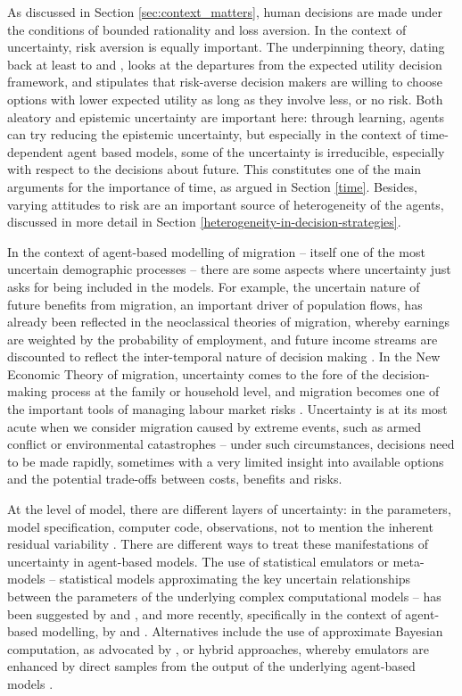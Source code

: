 \documentclass{article}
\begin{document}
As discussed in Section \ref{sec:context_matters}, human decisions are made under the conditions of bounded rationality and loss aversion. In the context of uncertainty, risk aversion is equally important. The underpinning theory, dating back at least to \citet{Pratt1964} and \citet{Arrow1965}, looks at the departures from the expected utility decision framework, and stipulates that risk-averse decision makers are willing to choose options with lower expected utility as long as they involve less, or no risk. Both aleatory and epistemic uncertainty are important here: through learning, agents can try reducing the epistemic uncertainty, but especially in the context of time-dependent agent based models, some of the uncertainty is irreducible, especially with respect to the decisions about future. This constitutes one of the main arguments for the importance of time, as argued in Section \ref{time}. Besides, varying attitudes to risk are an important source of heterogeneity of the agents, discussed in more detail in Section \ref{heterogeneity-in-decision-strategies}.

In the context of agent-based modelling of migration -- itself one of the most uncertain demographic processes -- there are some aspects where uncertainty just asks for being included in the models. For example, the uncertain nature of future benefits from migration, an important driver of population flows, has already been reflected in the neoclassical theories of migration, whereby earnings are weighted by the probability of employment, and future income streams are discounted to reflect the inter-temporal nature of decision making \citep{Massey1993}. In the New Economic Theory of migration, uncertainty comes to the fore of the decision-making process at the family or household level, and migration becomes one of the important tools of managing labour market risks \citep{Stark1985}. Uncertainty is at its most acute when we consider migration caused by extreme events, such as armed conflict or environmental catastrophes -- under such circumstances, decisions need to be made rapidly, sometimes with a very limited insight into available options and the potential trade-offs between costs, benefits and risks. 

At the level of model, there are different layers of uncertainty: in the parameters, model specification, computer code, observations, not to mention the inherent residual variability \citep{Kennedy2001}. There are different ways to treat these manifestations of uncertainty in agent-based models. The use of statistical emulators or meta-models \citep{Kleijnen2000} -- statistical models approximating the key uncertain relationships between the parameters of the underlying complex computational models -- has been suggested by \citet{Kennedy2001} and \citet{Oakley2004}, and more recently, specifically in the context of agent-based modelling, by \citet{Heard2015} and \citet{Hilton2016}. Alternatives include the use of approximate Bayesian computation, as advocated by \citep{Grazzini2017}, or hybrid approaches, whereby emulators are enhanced by direct samples from the output of the underlying agent-based models \citep{Kaminski2015}. 
\end{document}
